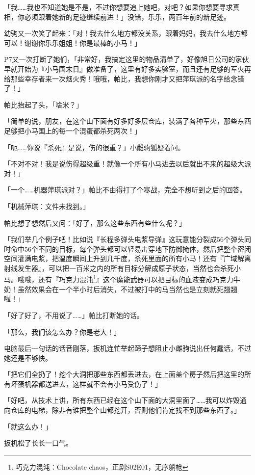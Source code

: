 「我……我也不知道她是不是，不过你想要追上她吧，对吧？如果你想要寻求真相，你必须跟着她新的足迹继续前进！」没错，乐乐，两百年前的新足迹。

幼驹又一次笑了起来：「对！我去什么地方都没关系，跟着妈妈，我去什么地方都可以！谢谢你乐乐姐姐！你是最棒的小马！」

P7又一次打断了她们，「非常好，我搞定这里的物品清单了，好像旭日公司的家伙早就开始为『小马国末日』做准备了，这里有好多实验室，而且还有足够的军火再给那些幸存者来一次烟火秀！哦哦，帕比，我想你刚才又把萍琪派的名字给念错了！」

帕比抬起了头，「啥米？」

「简单的说，朋友，在这个山下面有好多好多层仓库，装满了各种军火，那些东西足够把小马国上的每一个混蛋都杀死两次！」

「呃……你说『杀死』是说，伤的很重？」小雌驹狐疑着问。

「不对不对！我是说伤得超级重！就像一个所有小马进去以后就出不来的超级大派对！」

「一个……机器萍琪派对？」帕比不由得打了个寒战，完全不想听到之后的回答。

「机械萍琪：文件未找到。」

帕比想了想然后又问：「好了，那么这些东西有些什么呢？」

「我们举几个例子吧！比如说『长程多弹头电浆导弹』这玩意能分裂成56个弹头同时命中56个不同的目标，每个弹头都可以轻易击穿地下防御掩体，然后把整个密闭空间灌满电浆，把温度瞬间上升到几千度，杀死里面的所有小马！还有『广域解离射线发生器』，可以把一百米之内的所有目标分解成原子状态，当然也会杀死小马。哦哦，还有『巧克力混沌\footnote{巧克力混沌：Chocolate chaos，正剧S02E01，无序躺枪}』这个魔能武器可以把目标的血液变成巧克力牛奶！虽然效果会在一个半小时后消失，不过被打中的马当然也是立刻就死翘翘啦！」

「好了好了，不用说了……」帕比打断她的话。

「那么，我们该怎么办？你是老大！」

电脑最后一句话的话音刚落，扳机连忙举起蹄子想阻止小雌驹说出任何蠢话，不过她还是不够快。

「把它们全扔了！挖个大洞把那些东西都丢进去，在上面盖个房子然后把这里的所有坏蛋机器都送进去，这样就不会有小马受伤了！」

「好吧，从技术上讲，所有东西已经在这个山下面的大洞里面了……我可以炸毁通向仓库的电梯，除非有谁把整个山都挖开，否则他们肯定找不到那些东西了。」

「就这么办！」

扳机松了长长一口气。

\horizonline

